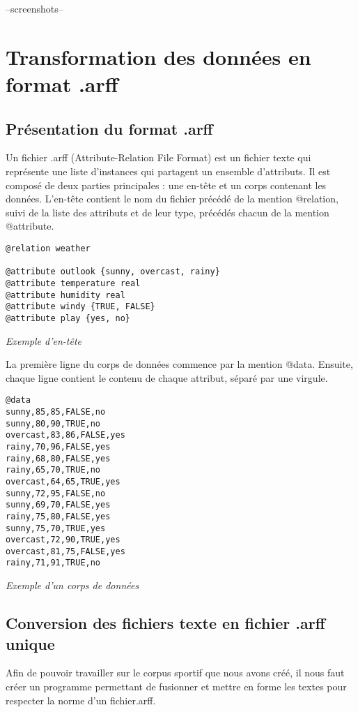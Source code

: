 \documentclass[a4paper,11pt]{article}
\begin{document}
--screenshots--

\newpage
\section{Transformation des données en format .arff}
\subsection{Présentation du format .arff}
Un fichier .arff (Attribute-Relation File Format) est un fichier texte qui représente une liste d’instances qui partagent un ensemble d’attributs. Il est composé de deux parties principales : une en-tête et un corps contenant les données.
L’en-tête contient le nom du fichier précédé de la mention @relation, suivi de la liste des attributs et de leur type, précédés chacun de la mention @attribute.\\

\begin{lstlisting}
@relation weather

@attribute outlook {sunny, overcast, rainy}
@attribute temperature real
@attribute humidity real
@attribute windy {TRUE, FALSE}
@attribute play {yes, no}
\end{lstlisting}
\begin{center}
\textit{Exemple d'en-tête}
\end{center}

La première ligne du corps de données commence par la mention @data. Ensuite, chaque ligne contient le contenu de chaque attribut, séparé par une virgule.\\

\begin{lstlisting}
@data
sunny,85,85,FALSE,no
sunny,80,90,TRUE,no
overcast,83,86,FALSE,yes
rainy,70,96,FALSE,yes
rainy,68,80,FALSE,yes
rainy,65,70,TRUE,no
overcast,64,65,TRUE,yes
sunny,72,95,FALSE,no
sunny,69,70,FALSE,yes
rainy,75,80,FALSE,yes
sunny,75,70,TRUE,yes
overcast,72,90,TRUE,yes
overcast,81,75,FALSE,yes
rainy,71,91,TRUE,no
\end{lstlisting}
\begin{center}
\textit{Exemple d’un corps de données}
\end{center}

\subsection{Conversion des fichiers texte en fichier .arff unique}
Afin de pouvoir travailler sur le corpus sportif que nous avons créé, il nous faut créer un programme permettant de fusionner et mettre en forme les textes pour respecter la norme d’un fichier.arff.
\end{document}
